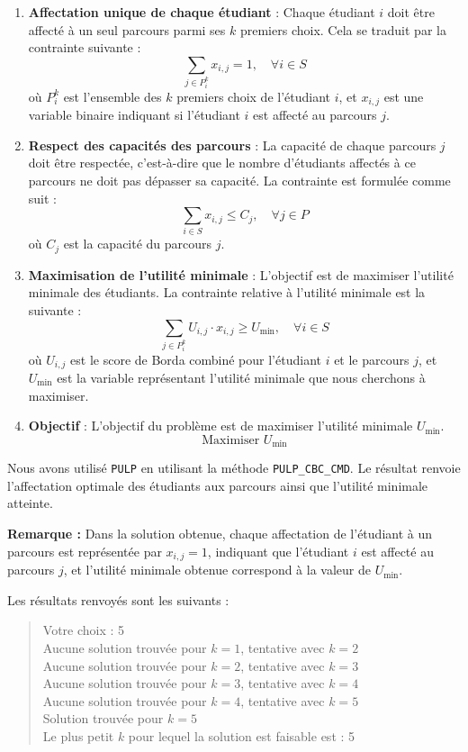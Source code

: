 \documentclass[a4paper,11pt]{article}
\begin{document}
\begin{enumerate}
    \item \textbf{Affectation unique de chaque étudiant} :
    Chaque étudiant \( i \) doit être affecté à un seul parcours parmi ses \( k \) premiers choix. Cela se traduit par la contrainte suivante :
    \[
    \sum_{j \in P_i^k} x_{i,j} = 1, \quad \forall i \in S
    \]
    où \( P_i^k \) est l'ensemble des \( k \) premiers choix de l'étudiant \( i \), et \( x_{i,j} \) est une variable binaire indiquant si l'étudiant \( i \) est affecté au parcours \( j \).

    \item \textbf{Respect des capacités des parcours} :
    La capacité de chaque parcours \( j \) doit être respectée, c'est-à-dire que le nombre d'étudiants affectés à ce parcours ne doit pas dépasser sa capacité. La contrainte est formulée comme suit :
    \[
    \sum_{i \in S} x_{i,j} \leq C_j, \quad \forall j \in P
    \]
    où \( C_j \) est la capacité du parcours \( j \).

    \item \textbf{Maximisation de l'utilité minimale} :
    L'objectif est de maximiser l'utilité minimale des étudiants. La contrainte relative à l'utilité minimale est la suivante :
    \[
    \sum_{j \in P_i^k} U_{i,j} \cdot x_{i,j} \geq U_{\min}, \quad \forall i \in S
    \]
    où \( U_{i,j} \) est le score de Borda combiné pour l'étudiant \( i \) et le parcours \( j \), et \( U_{\min} \) est la variable représentant l'utilité minimale que nous cherchons à maximiser.

    \item \textbf{Objectif} :
    L'objectif du problème est de maximiser l'utilité minimale \( U_{\min} \).
    \[
    \text{Maximiser } U_{\min}
    \]
\end{enumerate}

Nous avons utilisé \texttt{PULP} en utilisant la méthode \texttt{PULP\_CBC\_CMD}. Le résultat renvoie l'affectation optimale des étudiants aux parcours ainsi que l'utilité minimale atteinte.

\textbf{Remarque :} Dans la solution obtenue, chaque affectation de l'étudiant à un parcours est représentée par \( x_{i,j} = 1 \), indiquant que l'étudiant \( i \) est affecté au parcours \( j \), et l'utilité minimale obtenue correspond à la valeur de \( U_{\min} \).

Les résultats renvoyés sont les suivants :

\begin{quote}
Votre choix : 5\\
Aucune solution trouvée pour \( k = 1 \), tentative avec \( k = 2 \)\\
Aucune solution trouvée pour \( k = 2 \), tentative avec \( k = 3 \)\\
Aucune solution trouvée pour \( k = 3 \), tentative avec \( k = 4 \)\\
Aucune solution trouvée pour \( k = 4 \), tentative avec \( k = 5 \)\\
Solution trouvée pour \( k = 5 \)\\
Le plus petit \( k \) pour lequel la solution est faisable est : 5
\end{quote}
\end{document}
